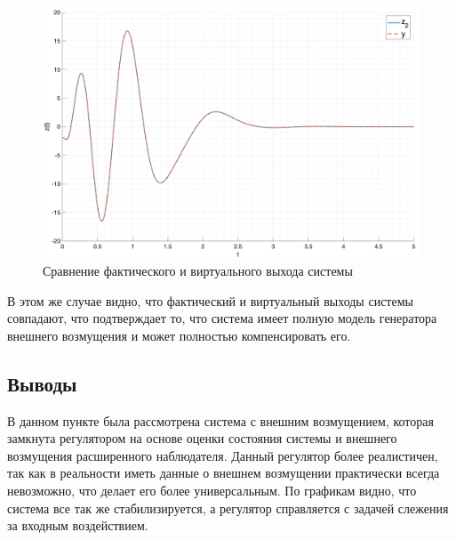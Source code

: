 \begin{figure}[ht!]
    \centering
    \includegraphics[width=\textwidth]{media/plots/task3_z2_cmp.png}
    \caption{Сравнение фактического и виртуального выхода системы}
    \label{fig:task3_z2_cmp}
\end{figure}
В этом же случае видно, что фактический и виртуальный выходы системы совпадают, что подтверждает то, 
что система имеет полную модель генератора внешнего возмущения и может полностью
компенсировать его.

\FloatBarrier

\subsection{Выводы}
В данном пункте была рассмотрена система с внешним возмущением, которая замкнута 
регулятором на основе оценки состояния системы и внешнего возмущения расширенного наблюдателя.
Данный регулятор более реалистичен, так как в реальности иметь данные о внешнем возмущении практически 
всегда невозможно, что делает его более универсальным. По графикам видно, что система все 
так же стабилизируется, а регулятор справляется с задачей слежения за входным воздействием. 